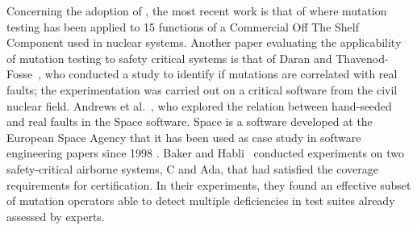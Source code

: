 Concerning the adoption of , the most recent work is that of \cite{delgado2018evaluation} where mutation testing has been applied to 15 functions of a Commercial Off The Shelf Component used in nuclear systems. 
Another paper evaluating the applicability of mutation testing to safety critical systems is that of Daran and Thavenod-Fosse~\cite{daran1996software}, who conducted a study to identify if mutations are correlated with real faults; the experimentation was carried out on a critical software from the civil nuclear field. Andrews et al.~\cite{andrews2005mutation}, who explored the relation between hand-seeded and real faults in the Space software. Space is a software developed at the European Space Agency that it has been used as case study in software engineering papers since 1998 \cite{frankl1998further}.
Baker and Habli~\cite{baker2012empirical} conducted experiments on two safety-critical airborne systems, C and Ada, that had satisfied the coverage requirements for certification. In their experiments, they found an effective subset of mutation operators able to detect multiple deficiencies in test suites already assessed by experts. 






\clearpage


